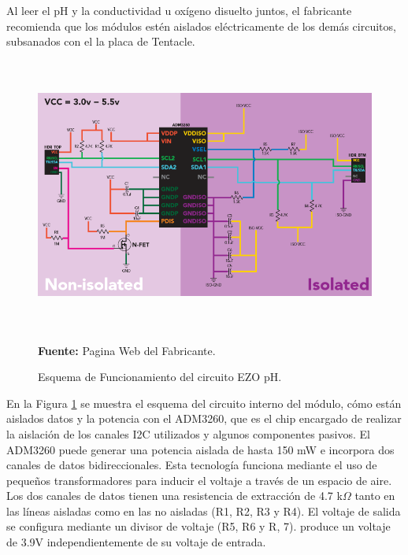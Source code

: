 Al leer el pH y la conductividad u oxígeno disuelto juntos, el fabricante recomienda que los módulos estén aislados eléctricamente de los demás circuitos, subsanados con el la placa de Tentacle.
\newline
\hfill
\begin{figure}[ht]
    \centering
    \includegraphics[width=150mm, height=90mm]{Imagenes/2021/imag36.png}
    \caption[Esquema de Funcionamiento del circuito EZO pH]{Esquema de Funcionamiento del circuito EZO pH.}{\textbf{Fuente: }Pagina Web del Fabricante\cite{ezoph}.}
    \label{fig:4.10}
\end{figure}
En la Figura \ref{fig:4.10} se muestra  el esquema del circuito interno del módulo, cómo están aislados datos y la potencia con el ADM3260, que es el chip encargado de realizar la aislación de los canales I2C utilizados y algunos componentes pasivos. El ADM3260 puede generar una potencia aislada de hasta 150 mW e incorpora dos canales de datos bidireccionales.
Esta tecnología funciona mediante el uso de pequeños transformadores para inducir el voltaje a través de un espacio de aire. Los dos canales de datos tienen una resistencia de extracción de 4.7 k$\Omega$ tanto en las líneas aisladas como en las no aisladas (R1, R2, R3 y R4). El voltaje de salida se configura mediante un divisor de voltaje (R5, R6 y R, 7). produce un voltaje de 3.9V independientemente de su voltaje de entrada.

